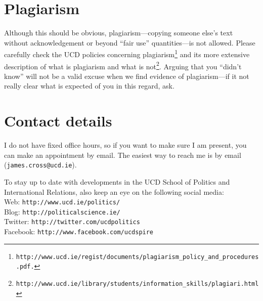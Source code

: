 \documentclass[a4paper,12pt]{article}
\begin{document}
\section*{Plagiarism}

	Although this should be obvious, plagiarism---copying someone else's text without acknowledgement or beyond ``fair use'' quantities---is not allowed. Please carefully check the UCD policies concerning plagiarism\footnote{{\tt http://www.ucd.ie/regist/documents/plagiarism\_policy\_and\_procedures.pdf.}} and its more extensive description of what is plagiarism and what is not\footnote{{\tt http://www.ucd.ie/library/students/information\_skills/plagiari.html}}. Arguing that you ``didn't know'' will not be a valid excuse when we find evidence of plagiarism---if it not really clear what is expected of you in this regard, ask.

\section*{Contact details}

	I do not have fixed office hours, so if you want to make sure I am present, you can make an appointment by email. The easiest way to reach me is by email ({\tt james.cross@ucd.ie}).

	To stay up to date with developments in the UCD School of Politics and International Relations, also keep an eye on the following social media:\\
Web: {\tt http://www.ucd.ie/politics/}\\
Blog: {\tt http://politicalscience.ie/}\\
Twitter: {\tt http://twitter.com/ucdpolitics}\\
Facebook: {\tt http://www.facebook.com/ucdspire}



\end{document}
